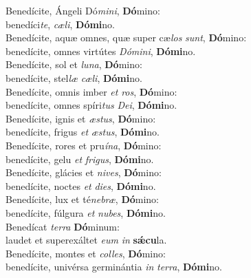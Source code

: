 \evenverse Benedícite, Ángeli Dó\textit{mi}\textit{ni}, \textbf{Dó}mino:~\*\\
\evenverse benedíci\textit{te}, \textit{cæ}\textit{li}, \textbf{Dó}\textbf{mi}no.\\
\oddverse Benedícite, aquæ omnes, quæ super cæ\textit{los} \textit{sunt}, \textbf{Dó}mino:~\*\\
\oddverse benedícite, omnes virtútes \textit{Dó}\textit{mi}\textit{ni}, \textbf{Dó}\textbf{mi}no.\\
\evenverse Benedícite, sol et \textit{lu}\textit{na}, \textbf{Dó}mino:~\*\\
\evenverse benedícite, stel\textit{læ} \textit{cæ}\textit{li}, \textbf{Dó}\textbf{mi}no.\\
\oddverse Benedícite, omnis imber \textit{et} \textit{ros}, \textbf{Dó}mino:~\*\\
\oddverse benedícite, omnes spíri\textit{tus} \textit{De}\textit{i}, \textbf{Dó}\textbf{mi}no.\\
\evenverse Benedícite, ignis et \textit{æ}\textit{stus}, \textbf{Dó}mino:~\*\\
\evenverse benedícite, frigus \textit{et} \textit{æ}\textit{stus}, \textbf{Dó}\textbf{mi}no.\\
\oddverse Benedícite, rores et pru\textit{í}\textit{na}, \textbf{Dó}mino:~\*\\
\oddverse benedícite, gelu \textit{et} \textit{fri}\textit{gus}, \textbf{Dó}\textbf{mi}no.\\
\evenverse Benedícite, glácies et \textit{ni}\textit{ves}, \textbf{Dó}mino:~\*\\
\evenverse benedícite, noctes \textit{et} \textit{di}\textit{es}, \textbf{Dó}\textbf{mi}no.\\
\oddverse Benedícite, lux et té\textit{ne}\textit{bræ}, \textbf{Dó}mino:~\*\\
\oddverse benedícite, fúlgura \textit{et} \textit{nu}\textit{bes}, \textbf{Dó}\textbf{mi}no.\\
\evenverse Benedícat \textit{ter}\textit{ra} \textbf{Dó}minum:~\*\\
\evenverse laudet et superexáltet \textit{e}\textit{um} \textit{in} \textbf{sǽ}\textbf{cu}la.\\
\oddverse Benedícite, montes et \textit{col}\textit{les}, \textbf{Dó}mino:~\*\\
\oddverse benedícite, univérsa germinántia \textit{in} \textit{ter}\textit{ra}, \textbf{Dó}\textbf{mi}no.\\

